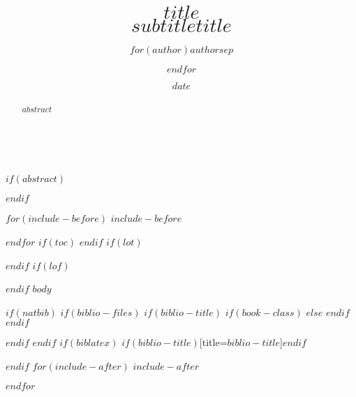 \documentclass[$if(fontsize)$$fontsize$,$endif$$if(lang)$$lang$,$endif$$if(papersize)$$papersize$,$endif$$for(classoption)$$classoption$$sep$,$endfor$]{$documentclass$}
\title{\textbf{$title$}\\
$subtitle$}
\title{$title$}
\title{}
\author{$for(author)$$author$$sep$ \and $endfor$}
\author{}
\date{$date$}
\date{}
\makeatletter
\renewcommand{\maketitle}{ %
	\begin{flushright} %
		{\LARGE\@title} %
		\vspace{50pt} %
		
		{\large\@author} %
		\\\@date %
		
		\vspace{40pt} %
	\end{flushright}
}
\makeatother
\begin{document}
\maketitle
$if(abstract)$
\begin{abstract}
$abstract$
\end{abstract}
$endif$

$for(include-before)$
$include-before$

$endfor$
$if(toc)$
{
\hypersetup{linkcolor=black}
\setcounter{tocdepth}{$toc-depth$}
\tableofcontents
}
$endif$
$if(lot)$
\listoftables
$endif$
$if(lof)$
\listoffigures
$endif$
$body$

$if(natbib)$
$if(biblio-files)$
$if(biblio-title)$
$if(book-class)$
\renewcommand\bibname{$biblio-title$}
$else$
\renewcommand\refname{$biblio-title$}
$endif$
$endif$


$endif$
$endif$
$if(biblatex)$
\printbibliography$if(biblio-title)$[title=$biblio-title$]$endif$

$endif$
$for(include-after)$
$include-after$

$endfor$
\end{document}
